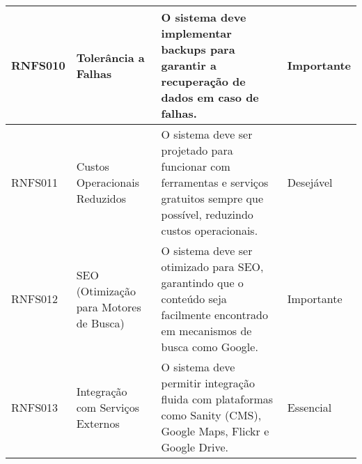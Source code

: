 {\begin{longtable}{|>{\raggedright}p{2.5cm}|>{\raggedright}p{4cm}|p{6cm}|>{\raggedright}p{2cm}|}
\hline
RNFS010 & Tolerância a Falhas & O sistema deve implementar backups para garantir a recuperação de dados em caso de falhas. & Importante \\
\hline
RNFS011 & Custos Operacionais Reduzidos & O sistema deve ser projetado para funcionar com ferramentas e serviços gratuitos sempre que possível, reduzindo custos operacionais. & Desejável \\
\hline
RNFS012 & SEO (Otimização para Motores de Busca) & O sistema deve ser otimizado para SEO, garantindo que o conteúdo seja facilmente encontrado em mecanismos de busca como Google. & Importante \\
\hline
RNFS013 & Integração com Serviços Externos & O sistema deve permitir integração fluida com plataformas como Sanity (CMS), Google Maps, Flickr e Google Drive. & Essencial \\
\hline
\end{longtable}
} %